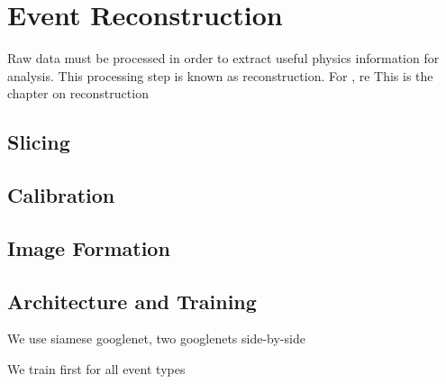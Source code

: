 \chapter{Event Reconstruction}
\label{reconstruction_chapter}

Raw data must be processed in order to extract useful physics information for analysis.
This processing step is known as reconstruction.
For \nova, re
This is the chapter on reconstruction


\section{Slicing}

\section{Calibration}


\section{Image Formation}

\section{Architecture and Training}

We use siamese googlenet, two googlenets side-by-side

We train first for all event types



